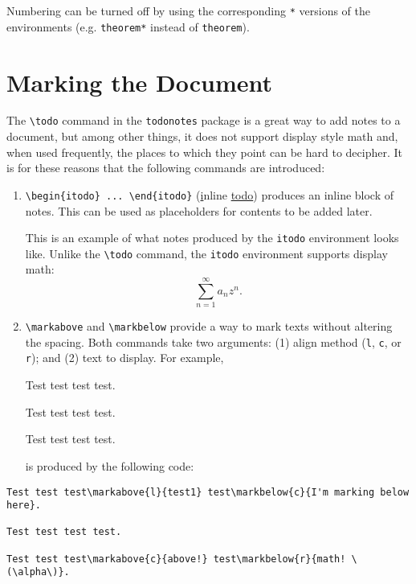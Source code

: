 \documentclass[11pt,oneside,letterpaper]{amsart}
\begin{document}
Numbering can be turned off by using the corresponding \verb|*| versions of the environments (e.g. \verb|theorem*| instead of \verb|theorem|). 


\section{Marking the Document}
\label{sec:marking}
The \verb|\todo| command in the \verb|todonotes| package is a great way to add notes to a document, but among other things, it does not support display style math and, when used frequently, the places to which they point can be hard to decipher. 
It is for these reasons that the following commands are introduced:
\begin{enumerate}[label=(\alph*)]
  \item \verb|\begin{itodo} ... \end{itodo}| (\underline{i}nline \underline{todo}) produces an inline block of notes. 
    This can be used as placeholders for contents to be added later. 
    \begin{itodo}
      This is an example of what notes produced by the \texttt{itodo} environment looks like. 
        Unlike the \texttt{\textbackslash todo} command, the \texttt{itodo} environment supports display math:
      \[
        \sum_{n=1}^{\infty} a_n z^n . 
      \] 
    \end{itodo}
  \item \verb|\markabove| and \verb|\markbelow| provide a way to mark texts without altering the spacing. 
  Both commands take two arguments: (1) align method (\verb|l|, \verb|c|, or \verb|r|); and (2) text to display. 
  For example, 

  \begin{mdframed}
    \noindent
    Test test test test.

    \noindent
    Test test test test.

    \noindent
    Test test test test.
  \end{mdframed}
  is produced by the following code:
\end{enumerate}
\begin{verbatim}
Test test test\markabove{l}{test1} test\markbelow{c}{I'm marking below here}.

Test test test test.

Test test test\markabove{c}{above!} test\markbelow{r}{math! \(\alpha\)}.
\end{verbatim}
\end{document}
